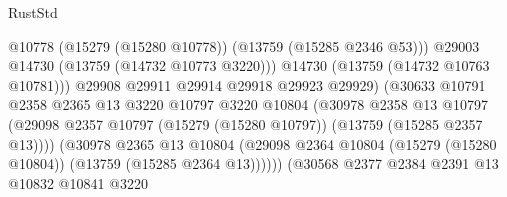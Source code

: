 \begin{lexlean}{RustStd}
\begin{coremodule}
                                                @10778
                                                (@15279 (@15280 @10778))
                                                (@13759 (@15285 @2346 @53)))
                                              @29003
                                              @14730
                                              (@13759 (@14732 @10773 @3220)))
                                            @14730
                                            (@13759 (@14732 @10763 @10781)))
                                          @29908
                                          @29911
                                          @29914
                                          @29918
                                          @29923
                                          @29929)
                                        (@30633
                                          @10791
                                          @2358
                                          @2365
                                          @13
                                          @3220
                                          @10797
                                          @3220
                                          @10804
                                          (@30978
                                            @2358
                                            @13
                                            @10797
                                            (@29098
                                              @2357
                                              @10797
                                              (@15279 (@15280 @10797))
                                              (@13759 (@15285 @2357 @13))))
                                          (@30978
                                            @2365
                                            @13
                                            @10804
                                            (@29098
                                              @2364
                                              @10804
                                              (@15279 (@15280 @10804))
                                              (@13759 (@15285 @2364 @13))))))
                                      (@30568
                                        @2377
                                        @2384
                                        @2391
                                        @13
                                        @10832
                                        @10841
                                        @3220

\end{coremodule}
\end{lexlean}
